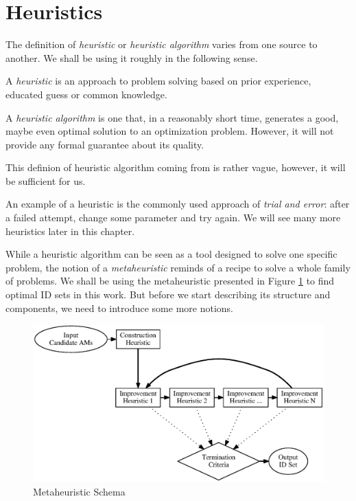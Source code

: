 \section{Heuristics}
\label{section-mip-heuristics}

The definition of \textit{heuristic} or \textit{heuristic algorithm} varies from one source to another. We shall be using it roughly in the following sense.

\begin{define}[Heuristic]
	A \textit{heuristic} is an approach to problem solving based on prior experience, educated guess or common knowledge.
\end{define}

\begin{define}
	A \textit{heuristic algorithm} is one that, in a reasonably short time, generates a good, maybe even optimal solution to an optimization problem. However, it will not provide any formal guarantee about its quality.
\end{define} 

This definion of heuristic algorithm coming from \cite{heu-lecture} is rather vague, however, it will be sufficient for us.

An example of a heuristic is the commonly used approach of \textit{trial and error}: after a failed attempt, change some parameter and try again. We will see many more heuristics later in this chapter.

While a heuristic algorithm can be seen as a tool designed to solve one specific problem, the notion of a \textit{metaheuristic} reminds of a recipe to solve a whole family of problems. We shall be using the metaheuristic presented in Figure \ref{image-metaheuristic} to find optimal ID sets in this work. But before we start describing its structure and components, we need to introduce some more notions.

\begin{figure}
  \caption{Metaheuristic Schema}
  \label{image-metaheuristic}
  \centering
    \includegraphics[width=\textwidth]{images/metaheuristic}
\end{figure}

